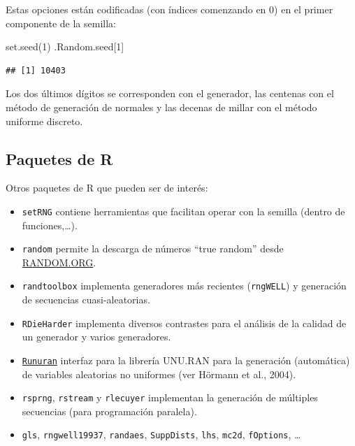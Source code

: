 \documentclass[
]{book}
\newenvironment{Shaded}{\begin{snugshade}}{\end{snugshade}}
\newcommand{\DecValTok}[1]{\textcolor[rgb]{0.00,0.00,0.81}{#1}}
\newcommand{\FunctionTok}[1]{\textcolor[rgb]{0.00,0.00,0.00}{#1}}
\newcommand{\NormalTok}[1]{#1}
\theoremstyle{break}
\theoremstyle{nonumberplain}
\begin{document}
Estas opciones están codificadas (con índices comenzando en 0) en el primer componente de la semilla:

\begin{Shaded}
\begin{Highlighting}[]
\FunctionTok{set.seed}\NormalTok{(}\DecValTok{1}\NormalTok{)}
\NormalTok{.Random.seed[}\DecValTok{1}\NormalTok{]}
\end{Highlighting}
\end{Shaded}

\begin{verbatim}
## [1] 10403
\end{verbatim}

Los dos últimos dígitos se corresponden con el generador, las centenas con el método de generación de normales y las decenas de millar con el método uniforme discreto.

\hypertarget{paquetes-de-r}{%
\subsection{Paquetes de R}\label{paquetes-de-r}}

Otros paquetes de R que pueden ser de interés:

\begin{itemize}
\item
  \texttt{setRNG} contiene herramientas que facilitan operar con la semilla
  (dentro de funciones,\ldots).
\item
  \texttt{random} permite la descarga de números ``true random'' desde \href{https://www.random.org}{RANDOM.ORG}.
\item
  \texttt{randtoolbox} implementa generadores más recientes (\texttt{rngWELL}) y
  generación de secuencias cuasi-aleatorias.
\item
  \texttt{RDieHarder} implementa diversos contrastes para el análisis de la
  calidad de un generador y varios generadores.
\item
  \href{http://statmath.wu.ac.at/unuran}{\texttt{Runuran}} interfaz para la librería UNU.RAN para la
  generación (automática) de variables aleatorias no uniformes (ver Hörmann et al., 2004).
\item
  \texttt{rsprng}, \texttt{rstream} y \texttt{rlecuyer} implementan la generación de múltiples
  secuencias (para programación paralela).
\item
  \texttt{gls}, \texttt{rngwell19937}, \texttt{randaes}, \texttt{SuppDists}, \texttt{lhs}, \texttt{mc2d},
  \texttt{fOptions}, \ldots{}
\end{itemize}
\end{document}
